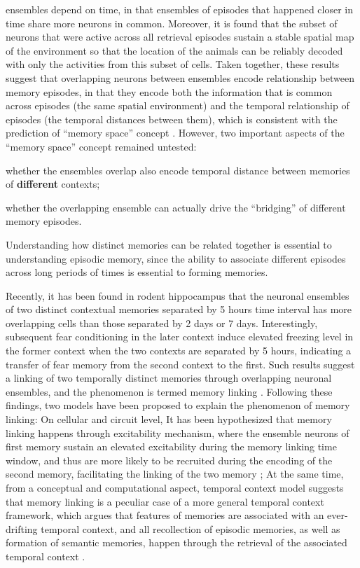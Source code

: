 \documentclass[master.tex]{subfiles}
\begin{document}
ensembles depend on time, in that ensembles of episodes that happened closer in
time share more neurons in common. Moreover, it is found that the subset of
neurons that were active across all retrieval episodes sustain a stable spatial
map of the environment so that the location of the animals can be reliably
decoded with only the activities from this subset of cells. Taken together,
these results suggest that overlapping neurons between ensembles encode
relationship between memory episodes, in that they encode both the information
that is common across episodes (the same spatial environment) and the temporal
relationship of episodes (the temporal distances between them), which is
consistent with the prediction of ``memory space'' concept
\cite{rubin_hippocampal_2015}. However, two important aspects of the ``memory
space'' concept remained untested:
\begin{inparaenum}[a)]
\item whether the ensembles overlap also encode temporal distance between
  memories of \textbf{different} contexts;
\item whether the overlapping ensemble can actually drive the ``bridging'' of
  different memory episodes.
\end{inparaenum}
Understanding how distinct memories can be related together is essential to
understanding episodic memory, since the ability to associate different episodes
across long periods of times is essential to forming memories.

Recently, it has been found in rodent hippocampus that the neuronal ensembles of
two distinct contextual memories separated by 5 hours time interval has more
overlapping cells than those separated by 2 days or 7 days. Interestingly,
subsequent fear conditioning in the later context induce elevated freezing level
in the former context when the two contexts are separated by 5 hours, indicating
a transfer of fear memory from the second context to the first. Such results
suggest a linking of two temporally distinct memories through overlapping
neuronal ensembles, and the phenomenon is termed memory linking
\cite{cai_shared_2016}. Following these findings, two models have been proposed
to explain the phenomenon of memory linking: On cellular and circuit level, It
has been hypothesized that memory linking happens through excitability
mechanism, where the ensemble neurons of first memory sustain an elevated
excitability during the memory linking time window, and thus are more likely to
be recruited during the encoding of the second memory, facilitating the linking
of the two memory \cite{kastellakis_linking_2016}; At the same time, from a
conceptual and computational aspect, temporal context model suggests that memory
linking is a peculiar case of a more general temporal context framework, which
argues that features of memories are associated with an ever-drifting temporal
context, and all recollection of episodic memories, as well as formation of
semantic memories, happen through the retrieval of the associated temporal
context \cite{howard_temporal_2005}.
\end{document}
